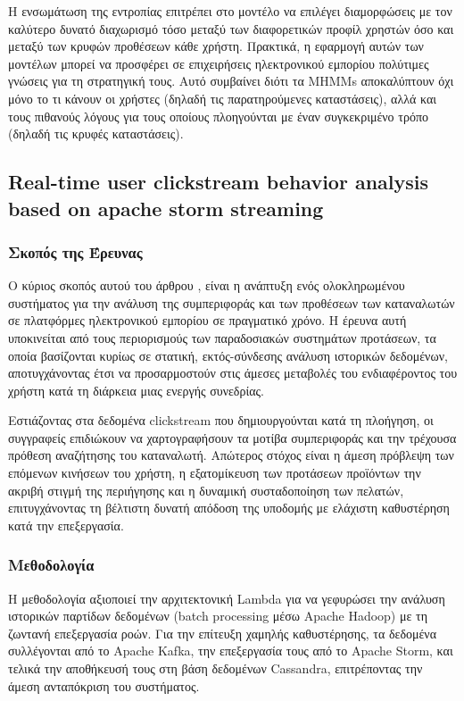 \documentclass[12pt,a4paper]{article}
\begin{document}
	Η ενσωμάτωση της εντροπίας επιτρέπει στο μοντέλο να επιλέγει διαμορφώσεις με τον καλύτερο δυνατό διαχωρισμό τόσο μεταξύ των διαφορετικών προφίλ χρηστών όσο και μεταξύ των κρυφών προθέσεων κάθε χρήστη. Πρακτικά, η εφαρμογή αυτών των μοντέλων μπορεί να προσφέρει σε επιχειρήσεις ηλεκτρονικού εμπορίου πολύτιμες γνώσεις για τη στρατηγική τους. Αυτό συμβαίνει διότι τα MHMMs αποκαλύπτουν όχι μόνο το τι κάνουν οι χρήστες (δηλαδή τις παρατηρούμενες καταστάσεις), αλλά και τους πιθανούς λόγους για τους οποίους πλοηγούνται με έναν συγκεκριμένο τρόπο (δηλαδή τις κρυφές καταστάσεις).
	
	\subsection{Real-time user clickstream behavior analysis based on apache storm streaming}
	
	
	\subsubsection{Σκοπός της Έρευνας}
	Ο κύριος σκοπός αυτού του άρθρου \cite{Apache}, είναι η ανάπτυξη ενός ολοκληρωμένου συστήματος για την ανάλυση της συμπεριφοράς και των προθέσεων των καταναλωτών σε πλατφόρμες ηλεκτρονικού εμπορίου σε πραγματικό χρόνο. Η έρευνα αυτή υποκινείται από τους περιορισμούς των παραδοσιακών συστημάτων προτάσεων, τα οποία βασίζονται κυρίως σε στατική, εκτός-σύνδεσης ανάλυση ιστορικών δεδομένων, αποτυγχάνοντας έτσι να προσαρμοστούν στις άμεσες μεταβολές του ενδιαφέροντος του χρήστη κατά τη διάρκεια μιας ενεργής συνεδρίας.
	
	Εστιάζοντας στα δεδομένα clickstream που δημιουργούνται κατά τη πλοήγηση, οι συγγραφείς επιδιώκουν να χαρτογραφήσουν τα μοτίβα συμπεριφοράς και την τρέχουσα πρόθεση αναζήτησης του καταναλωτή. Απώτερος στόχος είναι η άμεση πρόβλεψη των επόμενων κινήσεων του χρήστη, η εξατομίκευση των προτάσεων προϊόντων την ακριβή στιγμή της περιήγησης και η δυναμική συσταδοποίηση των πελατών, επιτυγχάνοντας τη βέλτιστη δυνατή απόδοση της υποδομής με ελάχιστη καθυστέρηση κατά την επεξεργασία.
	
	\subsubsection{Μεθοδολογία}
	Η μεθοδολογία αξιοποιεί την αρχιτεκτονική Lambda για να γεφυρώσει την ανάλυση ιστορικών παρτίδων δεδομένων (batch processing μέσω Apache Hadoop) με τη ζωντανή επεξεργασία ροών. Για την επίτευξη χαμηλής καθυστέρησης, τα δεδομένα συλλέγονται από το Apache Kafka, την επεξεργασία τους από το Apache Storm, και τελικά την αποθήκευσή τους στη βάση δεδομένων Cassandra, επιτρέποντας την άμεση ανταπόκριση του συστήματος.
	
\end{document}
